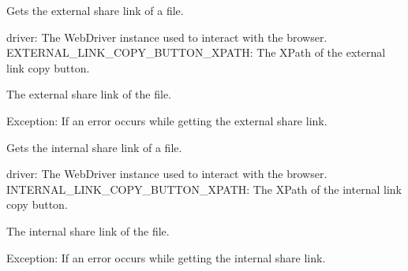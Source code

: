 \documentclass[letterpaper,10pt,english]{sphinxmanual}
\begin{document}
\begin{fulllineitems}
\label{\detokenize{utils:utils.file_management.get_external_share_link}}
\pysigstartsignatures
{}
\pysigstopsignatures
\sphinxAtStartPar
Gets the external share link of a file.
\begin{description}
\sphinxAtStartPar
driver: The WebDriver instance used to interact with the browser.
EXTERNAL\_LINK\_COPY\_BUTTON\_XPATH: The XPath of the external link copy button.

\sphinxAtStartPar
The external share link of the file.

\sphinxAtStartPar
Exception: If an error occurs while getting the external share link.

\end{description}

\end{fulllineitems}


\begin{fulllineitems}
\label{\detokenize{utils:utils.file_management.get_internal_share_link}}
\pysigstartsignatures
{}
\pysigstopsignatures
\sphinxAtStartPar
Gets the internal share link of a file.
\begin{description}
\sphinxAtStartPar
driver: The WebDriver instance used to interact with the browser.
INTERNAL\_LINK\_COPY\_BUTTON\_XPATH: The XPath of the internal link copy button.

\sphinxAtStartPar
The internal share link of the file.

\sphinxAtStartPar
Exception: If an error occurs while getting the internal share link.

\end{description}

\end{fulllineitems}
\end{document}
